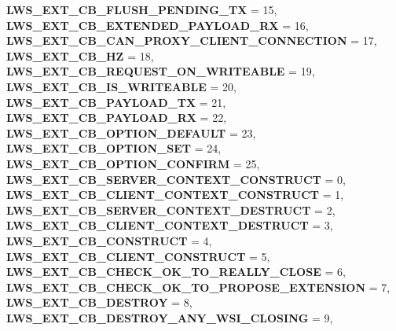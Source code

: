 \begin{DoxyCompactItemize}
{\bfseries L\+W\+S\+\_\+\+E\+X\+T\+\_\+\+C\+B\+\_\+\+F\+L\+U\+S\+H\+\_\+\+P\+E\+N\+D\+I\+N\+G\+\_\+\+TX} = 15, 
{\bfseries L\+W\+S\+\_\+\+E\+X\+T\+\_\+\+C\+B\+\_\+\+E\+X\+T\+E\+N\+D\+E\+D\+\_\+\+P\+A\+Y\+L\+O\+A\+D\+\_\+\+RX} = 16, 
{\bfseries L\+W\+S\+\_\+\+E\+X\+T\+\_\+\+C\+B\+\_\+\+C\+A\+N\+\_\+\+P\+R\+O\+X\+Y\+\_\+\+C\+L\+I\+E\+N\+T\+\_\+\+C\+O\+N\+N\+E\+C\+T\+I\+ON} = 17, 
\newline
{\bfseries L\+W\+S\+\_\+\+E\+X\+T\+\_\+\+C\+B\+\_\+HZ} = 18, 
{\bfseries L\+W\+S\+\_\+\+E\+X\+T\+\_\+\+C\+B\+\_\+\+R\+E\+Q\+U\+E\+S\+T\+\_\+\+O\+N\+\_\+\+W\+R\+I\+T\+E\+A\+B\+LE} = 19, 
{\bfseries L\+W\+S\+\_\+\+E\+X\+T\+\_\+\+C\+B\+\_\+\+I\+S\+\_\+\+W\+R\+I\+T\+E\+A\+B\+LE} = 20, 
{\bfseries L\+W\+S\+\_\+\+E\+X\+T\+\_\+\+C\+B\+\_\+\+P\+A\+Y\+L\+O\+A\+D\+\_\+\+TX} = 21, 
\newline
{\bfseries L\+W\+S\+\_\+\+E\+X\+T\+\_\+\+C\+B\+\_\+\+P\+A\+Y\+L\+O\+A\+D\+\_\+\+RX} = 22, 
{\bfseries L\+W\+S\+\_\+\+E\+X\+T\+\_\+\+C\+B\+\_\+\+O\+P\+T\+I\+O\+N\+\_\+\+D\+E\+F\+A\+U\+LT} = 23, 
{\bfseries L\+W\+S\+\_\+\+E\+X\+T\+\_\+\+C\+B\+\_\+\+O\+P\+T\+I\+O\+N\+\_\+\+S\+ET} = 24, 
{\bfseries L\+W\+S\+\_\+\+E\+X\+T\+\_\+\+C\+B\+\_\+\+O\+P\+T\+I\+O\+N\+\_\+\+C\+O\+N\+F\+I\+RM} = 25, 
\newline
{\bfseries L\+W\+S\+\_\+\+E\+X\+T\+\_\+\+C\+B\+\_\+\+S\+E\+R\+V\+E\+R\+\_\+\+C\+O\+N\+T\+E\+X\+T\+\_\+\+C\+O\+N\+S\+T\+R\+U\+CT} = 0, 
{\bfseries L\+W\+S\+\_\+\+E\+X\+T\+\_\+\+C\+B\+\_\+\+C\+L\+I\+E\+N\+T\+\_\+\+C\+O\+N\+T\+E\+X\+T\+\_\+\+C\+O\+N\+S\+T\+R\+U\+CT} = 1, 
{\bfseries L\+W\+S\+\_\+\+E\+X\+T\+\_\+\+C\+B\+\_\+\+S\+E\+R\+V\+E\+R\+\_\+\+C\+O\+N\+T\+E\+X\+T\+\_\+\+D\+E\+S\+T\+R\+U\+CT} = 2, 
{\bfseries L\+W\+S\+\_\+\+E\+X\+T\+\_\+\+C\+B\+\_\+\+C\+L\+I\+E\+N\+T\+\_\+\+C\+O\+N\+T\+E\+X\+T\+\_\+\+D\+E\+S\+T\+R\+U\+CT} = 3, 
\newline
{\bfseries L\+W\+S\+\_\+\+E\+X\+T\+\_\+\+C\+B\+\_\+\+C\+O\+N\+S\+T\+R\+U\+CT} = 4, 
{\bfseries L\+W\+S\+\_\+\+E\+X\+T\+\_\+\+C\+B\+\_\+\+C\+L\+I\+E\+N\+T\+\_\+\+C\+O\+N\+S\+T\+R\+U\+CT} = 5, 
{\bfseries L\+W\+S\+\_\+\+E\+X\+T\+\_\+\+C\+B\+\_\+\+C\+H\+E\+C\+K\+\_\+\+O\+K\+\_\+\+T\+O\+\_\+\+R\+E\+A\+L\+L\+Y\+\_\+\+C\+L\+O\+SE} = 6, 
{\bfseries L\+W\+S\+\_\+\+E\+X\+T\+\_\+\+C\+B\+\_\+\+C\+H\+E\+C\+K\+\_\+\+O\+K\+\_\+\+T\+O\+\_\+\+P\+R\+O\+P\+O\+S\+E\+\_\+\+E\+X\+T\+E\+N\+S\+I\+ON} = 7, 
\newline
{\bfseries L\+W\+S\+\_\+\+E\+X\+T\+\_\+\+C\+B\+\_\+\+D\+E\+S\+T\+R\+OY} = 8, 
{\bfseries L\+W\+S\+\_\+\+E\+X\+T\+\_\+\+C\+B\+\_\+\+D\+E\+S\+T\+R\+O\+Y\+\_\+\+A\+N\+Y\+\_\+\+W\+S\+I\+\_\+\+C\+L\+O\+S\+I\+NG} = 9, 

\end{DoxyCompactItemize}

